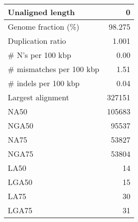 \documentclass[12pt,a4paper]{article}
\begin{document}
\begin{table}[ht]
\begin{center}
\begin{tabular}{|l*{1}{|r}|}
Unaligned length & 0 \\ \hline
Genome fraction (\%) & 98.275 \\ \hline
Duplication ratio & 1.001 \\ \hline
\# N's per 100 kbp & 0.00 \\ \hline
\# mismatches per 100 kbp & 1.51 \\ \hline
\# indels per 100 kbp & 0.04 \\ \hline
Largest alignment & 327151 \\ \hline
NA50 & 105683 \\ \hline
NGA50 & 95537 \\ \hline
NA75 & 53827 \\ \hline
NGA75 & 53804 \\ \hline
LA50 & 14 \\ \hline
LGA50 & 15 \\ \hline
LA75 & 30 \\ \hline
LGA75 & 31 \\ \hline
\end{tabular}
\end{center}
\end{table}
\end{document}
